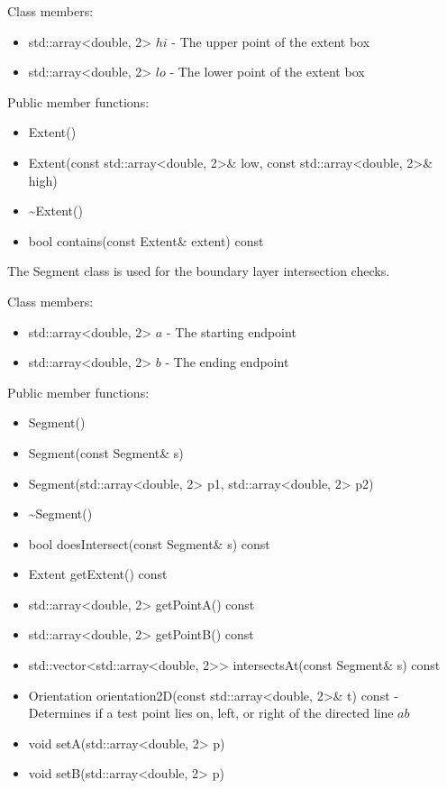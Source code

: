 \documentclass[manuscript, screen]{acmart}
\begin{document}
Class members:
\begin{itemize}
\item std::array<double, 2> $hi$ - The upper point of the extent box
\item std::array<double, 2> $lo$ - The lower point of the extent box
\end{itemize}

Public member functions:
\begin{itemize}
\item Extent()

\item Extent(const std::array<double, 2>\& low, const std::array<double, 2>\& high)

\item \textasciitilde{}Extent()
%

\item bool contains(const Extent\& extent) const
\end{itemize}

The Segment class is used for the boundary layer intersection checks.

Class members:
\begin{itemize}
\item std::array<double, 2> $a$ - The starting endpoint
\item std::array<double, 2> $b$ - The ending endpoint
\end{itemize}

Public member functions:
\begin{itemize}
\item Segment()

\item Segment(const Segment\& s)

\item Segment(std::array<double, 2> p1, std::array<double, 2> p2)

\item \textasciitilde{}Segment()
%

\item bool doesIntersect(const Segment\& s) const

\item Extent getExtent() const
\item std::array<double, 2> getPointA() const
\item std::array<double, 2> getPointB() const

\item std::vector<std::array<double, 2>> intersectsAt(const Segment\& s) const

\item Orientation orientation2D(const std::array<double, 2>\& t) const - Determines if a test point lies on, left, or right of the directed line $ab$

\item void setA(std::array<double, 2> p)
\item void setB(std::array<double, 2> p)

\end{itemize}
\end{document}
